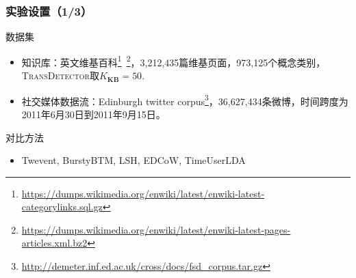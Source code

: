 \begin{frame}
\frametitle{\noindent 实验设置（1/3）}
\noindent 数据集
\begin{itemize}
	\item 知识库：英文维基百科\footnote{\tiny{\url{https://dumps.wikimedia.org/enwiki/latest/enwiki-latest-categorylinks.sql.gz}}}\ \footnote{\tiny{\url{https://dumps.wikimedia.org/enwiki/latest/enwiki-latest-pages-articles.xml.bz2}}}，3,212,435篇维基页面，973,125个概念类别，\textsc{TransDetector}取$K_{\bm{KB}}=50$.
	\item 社交媒体数据流：Edinburgh twitter corpus\footnote{\tiny{\url{http://demeter.inf.ed.ac.uk/cross/docs/fsd_corpus.tar.gz}}}，36,627,434条微博，时间跨度为2011年6月30日到2011年9月15日。
\end{itemize} 
对比方法
\begin{itemize}
	\item Twevent, BurstyBTM, LSH, EDCoW, TimeUserLDA
\end{itemize}
\end{frame}

